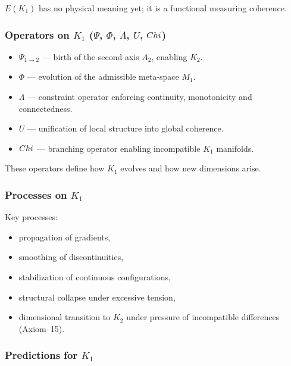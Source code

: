 $E(K_1)$ has no physical meaning yet; it is a functional measuring
coherence.

\subsubsection{Operators on \texorpdfstring{$K_1$}{K_1} (\texorpdfstring{$\Psi$}{\Psi}, \texorpdfstring{$\Phi$}{\Phi}, \texorpdfstring{$\Lambda$}{\Lambda}, \texorpdfstring{$U$}{U}, \texorpdfstring{$Chi$}{\Chi})}

\begin{itemize}
    \item $\Psi_{1\to2}$ — birth of the second axis $A_2$, enabling
          $K_2$.
    \item $\Phi$ — evolution of the admissible meta-space $M_1$.
    \item $\Lambda$ — constraint operator enforcing continuity,
          monotonicity and connectedness.
    \item $U$ — unification of local structure into global coherence.
    \item $Chi$ — branching operator enabling incompatible $K_1$
          manifolds.
\end{itemize}

These operators define how $K_1$ evolves and how new dimensions arise.

\subsubsection{Processes on \texorpdfstring{$K_1$}{K_1}}

Key processes:
\begin{itemize}
    \item propagation of gradients,
    \item smoothing of discontinuities,
    \item stabilization of continuous configurations,
    \item structural collapse under excessive tension,
    \item dimensional transition to $K_2$ under pressure of
          incompatible differences (Axiom~15).
\end{itemize}

\subsubsection{Predictions for \texorpdfstring{$K_1$}{K_1}}

